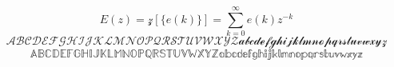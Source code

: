 \documentclass{article} %
\begin{document}
\[
E(z) = \mathscr{z}[\{e(k)\}] = \sum_{k=0}^{\infty} e(k) z^{-k}
\]
\[
\mathscr{ABCDEFGHIJKLMNOPQRSTUVWXYZabcdefghijklmnopqrstuvwxyz}
\]
\[
\mathbb{ABCDEFGHIJKLMNOPQRSTUVWXYZabcdefghijklmnopqrstuvwxyz}
\]
\end{document}
